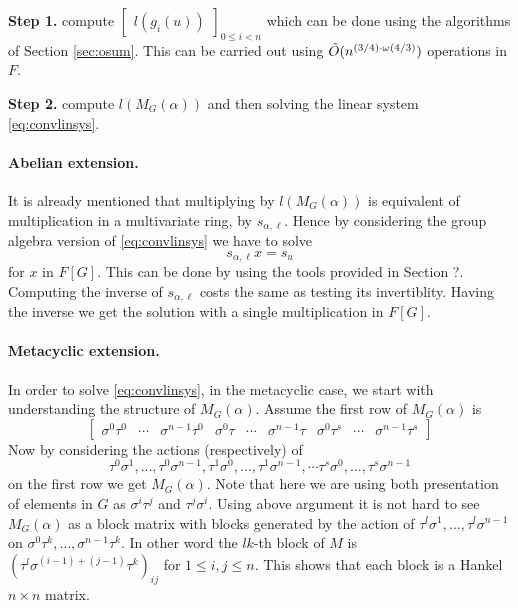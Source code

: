 \smallskip\noindent\textbf{Step 1.} compute $\begin{bmatrix} l(g_i(u)) \end{bmatrix}_{0 \leq i <n}$ which can be done using
the algorithms of Section \ref{sec:osum}. This can be carried out using $\tilde{O}(n^{(3/4)\cdot \omega(4/3)})$ operations in $F$.

\smallskip\noindent\textbf{Step 2.} compute $l(M_G(\alpha))$ and then solving the linear system \eqref{eq:convlinsys}.

\paragraph{Abelian extension.}
It is already mentioned that multiplying by $l(M_G(\alpha))$ is equivalent of multiplication in a multivariate ring, by 
$s_{\alpha, \ell}$. Hence by considering the group algebra version of \eqref{eq:convlinsys} we have to solve $$s_{\alpha,\ell} x 
= s_u$$ for $x$ 
in $F[G]$. This can be done by using the tools provided in Section ?. Computing the inverse of $s_{\alpha,\ell}$ costs the same 
as testing its invertiblity. Having the inverse we get the solution with a single multiplication in $F[G]$.

\paragraph{Metacyclic extension.}

In order to solve \eqref{eq:convlinsys}, in the metacyclic case, we start with understanding the structure of $M_G(\alpha)$. 
Assume the first row of $M_G(\alpha)$ is 
$$\begin{bmatrix}
\sigma^0 \tau^0 &  \cdots & \sigma^{n-1} \tau^0 & \sigma^0 \tau &  \cdots & \sigma^{n-1} \tau & \sigma^0 \tau^s &  \cdots & 
\sigma^{n-1} \tau^s 
\end{bmatrix}$$
Now by considering the actions (respectively) of
$$\tau^0 \sigma^1, \ldots , \tau^0 \sigma^{n-1}, \tau^1 \sigma^0, \ldots , \tau^1 \sigma^{n-1} , \cdots \tau^s \sigma^0, \ldots 
, \tau^s \sigma^{n-1}$$
on the first row we get $M_G(\alpha)$.
Note that here we are using both presentation of elements in $G$ as $\sigma^i\tau^j$ and $\tau^j\sigma^i$. Using above argument 
it is not hard to see $M_G(\alpha)$ as a block matrix with blocks generated by the action of $\tau^l \sigma^1, \ldots , \tau^l 
\sigma^{n-1}$ on $\sigma^0 \tau^k ,  \ldots , \sigma^{n-1} \tau^k$. In other word the $lk$-th block of $M$ is 
$\left( \tau^l \sigma^{(i-1)+(j-1)} \tau^k \right)_{ij}$ for $1 \leq i,j \leq n$. This shows that each block is a Hankel $n \times n$ matrix.



